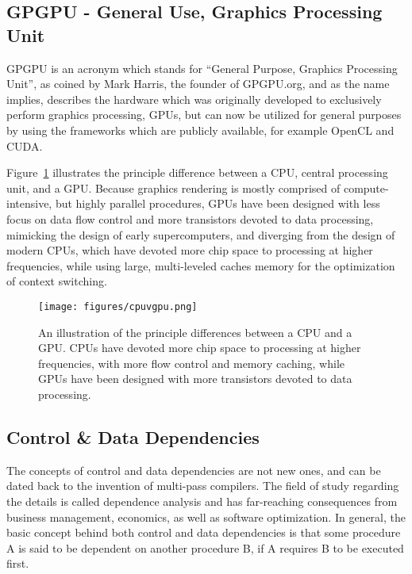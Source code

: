 %
%
%
%
\subsection{GPGPU - General Use, Graphics Processing Unit}
GPGPU is an acronym which stands for ``General Purpose, Graphics Processing Unit'', as coined by Mark Harris, the founder of GPGPU.org, and as the name implies, describes the hardware which was originally developed to exclusively perform graphics processing, GPUs, but can now be utilized for general purposes by using the frameworks which are publicly available, for example OpenCL and CUDA.

Figure~\ref{fig:cpuvgpu} illustrates the principle difference between a CPU, central processing unit, and a GPU. Because graphics rendering is mostly comprised of compute-intensive, but highly parallel procedures, GPUs have been designed with less focus on data flow control and more transistors devoted to data processing, mimicking the design of early supercomputers, and diverging from the design of modern CPUs, which have devoted more chip space to processing at higher frequencies, while using large, multi-leveled caches memory for the optimization of context switching.

\begin{figure}[ht]
\ffigbox
	{\texttt{[image: figures/cpuvgpu.png]}}%
	{\caption[CPU vs GPU Construction]{An illustration of the principle differences between a CPU and a GPU. CPUs have devoted more chip space to processing at higher frequencies, with more flow control and memory caching, while GPUs have been designed with more transistors devoted to data processing.}\label{fig:cpuvgpu}}
\end{figure}

%
%
%
%
\subsection{Control \& Data Dependencies}
\label{ch2sPPssCS}

The concepts of control and data dependencies are not new ones, and can be dated back to the invention of multi-pass compilers. The field of study regarding the details is called dependence analysis and has far-reaching consequences from business management, economics, as well as software optimization. In general, the basic concept behind both control and data dependencies is that some procedure A is said to be dependent on another procedure B, if A requires B to be executed first.

